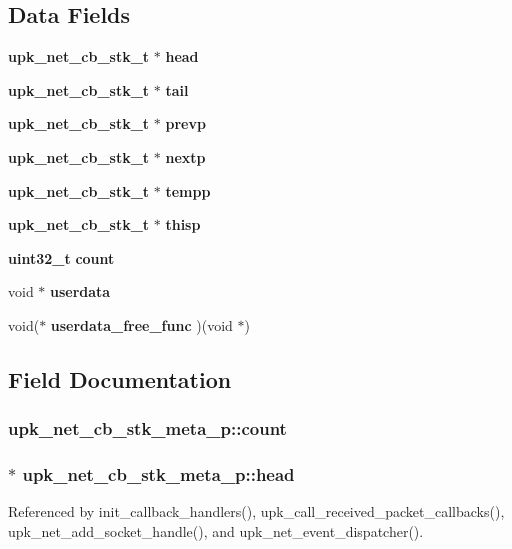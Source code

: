 \subsection*{Data Fields}
\begin{DoxyCompactItemize}
\item 
{\bf upk\_\-net\_\-cb\_\-stk\_\-t} $\ast$ {\bf head}
\item 
{\bf upk\_\-net\_\-cb\_\-stk\_\-t} $\ast$ {\bf tail}
\item 
{\bf upk\_\-net\_\-cb\_\-stk\_\-t} $\ast$ {\bf prevp}
\item 
{\bf upk\_\-net\_\-cb\_\-stk\_\-t} $\ast$ {\bf nextp}
\item 
{\bf upk\_\-net\_\-cb\_\-stk\_\-t} $\ast$ {\bf tempp}
\item 
{\bf upk\_\-net\_\-cb\_\-stk\_\-t} $\ast$ {\bf thisp}
\item 
{\bf uint32\_\-t} {\bf count}
\item 
void $\ast$ {\bf userdata}
\item 
void($\ast$ {\bf userdata\_\-free\_\-func} )(void $\ast$)
\end{DoxyCompactItemize}


\subsection{Field Documentation}
\subsubsection[{count}]{ {\bf upk\_\-net\_\-cb\_\-stk\_\-meta\_\-p::count}}\label{structupk__net__cb__stk__meta__p_ae701ee169660688ea2ee4539fd318aa0}
\subsubsection[{head}]{ $\ast$ {\bf upk\_\-net\_\-cb\_\-stk\_\-meta\_\-p::head}}\label{structupk__net__cb__stk__meta__p_a464f856ae702f7b54b554ee02d95c007}


Referenced by init\_\-callback\_\-handlers(), upk\_\-call\_\-received\_\-packet\_\-callbacks(), upk\_\-net\_\-add\_\-socket\_\-handle(), and upk\_\-net\_\-event\_\-dispatcher().

